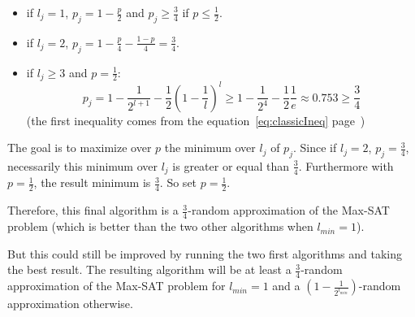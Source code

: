 \begin{itemize}
\item if $l_j = 1$, $p_j = 1 - \frac{p}{2}$ and $p_j \ge \frac{3}{4}$ if $p \le
\frac{1}{2}$.
\item if $l_j = 2$, $p_j = 1 - \frac{p}{4} - \frac{1-p}{4} = \frac{3}{4}$.
\item if $l_j \ge 3$ and $p= \frac{1}{2}$:
\[ p_j = 1 - \frac{1}{2^{l+1}} - \frac{1}{2} \left( 1 - \frac{1}{l} \right)^l \ge 1
- \frac{1}{2^4} - \frac{1}{2}\frac{1}{e}  \approx 0.753 \ge \frac{3}{4}\]
(the first inequality comes from the equation~\eqref{eq:classicIneq}
page~\pageref{eq:classicIneq})
\end{itemize}

The goal is to maximize over $p$ the minimum over $l_j$ of $p_j$. Since if $l_j =
2$, $p_j = \frac{3}{4}$, necessarily this minimum over $l_j$ is greater or equal
than $\frac{3}{4}$. Furthermore with $p=\frac{1}{2}$, the result minimum is
$\frac{3}{4}$. So set $p=\frac{1}{2}$.

Therefore, this final algorithm is a $\frac{3}{4}$-random approximation of the Max-SAT
problem (which is better than the two other algorithms when $l_{min} = 1$).

But this could still be improved by running the two first algorithms and taking the
best result. The resulting algorithm will be at least a $\frac{3}{4}$-random
approximation of the Max-SAT problem for $l_{min} = 1$ and a $(1 -
\frac{1}{2^{l_{min}}})$-random approximation otherwise.
